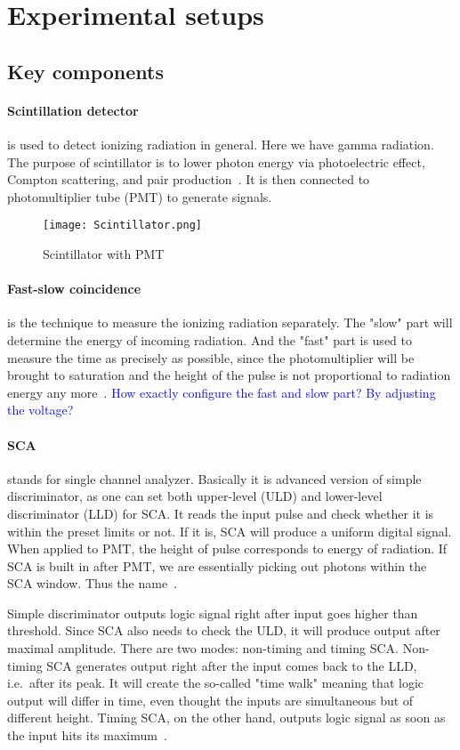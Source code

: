 \section{Experimental setups}

\subsection{Key components}
\paragraph{Scintillation detector}
is used to detect ionizing radiation in general. Here we have gamma radiation. The purpose of scintillator is to lower photon energy via photoelectric effect, Compton scattering, and pair production~\cite{wermes}. It is then connected to photomultiplier tube (PMT) to generate signals.
\begin{figure}[ht]
   \centering
   \texttt{[image: Scintillator.png]}
   \caption{Scintillator with PMT~\cite{wikiScin}}%
\end{figure}

\paragraph{Fast-slow coincidence} is the technique to measure the ionizing radiation separately. The "slow" part will determine the energy of incoming radiation. And the "fast" part is used to measure the time as precisely as possible, since the photomultiplier will be brought to saturation and the height of the pulse is not proportional to radiation energy any more~\cite{IACI1968103}. \textcolor{blue}{How exactly configure the fast and slow part? By adjusting the voltage?}

\paragraph{SCA} stands for single channel analyzer. Basically it is advanced version of simple discriminator, as one can set both upper-level (ULD) and lower-level discriminator (LLD) for SCA. It reads the input pulse and check whether it is within the preset limits or not. If it is, SCA will produce a uniform digital signal.
When applied to PMT, the height of pulse corresponds to energy of radiation. If SCA is built in after PMT, we are essentially picking out photons within the SCA window. Thus the name~\cite{SCAmanual}.

Simple discriminator outputs logic signal right after input goes higher than threshold. Since SCA also needs to check the ULD, it will produce output after maximal amplitude. There are two modes: non-timing and timing SCA. Non-timing SCA generates output right after the input comes back to the LLD, i.e.~after its peak. It will create the so-called "time walk" meaning that logic output will differ in time, even thought the inputs are simultaneous but of different height. Timing SCA, on the other hand, outputs logic signal as soon as the input hits its maximum~\cite{SCAmanual}.

